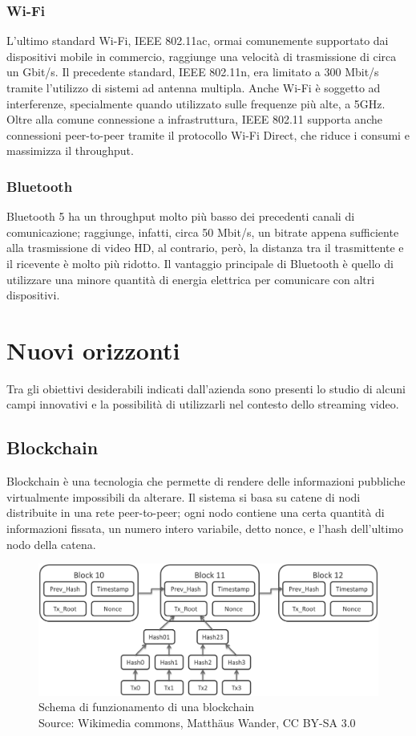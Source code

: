 		\subsubsection{Wi-Fi}
			L'ultimo standard Wi-Fi, \gls{IEEE} 802.11ac, ormai comunemente supportato dai dispositivi mobile in commercio, raggiunge una velocità di trasmissione di circa un Gbit/s. Il precedente standard, \gls{IEEE} 802.11n, era limitato a 300 Mbit/s tramite l'utilizzo di sistemi ad antenna multipla. Anche Wi-Fi è soggetto ad interferenze, specialmente quando utilizzato sulle frequenze più alte, a 5GHz. Oltre alla comune connessione a infrastruttura, \gls{IEEE} 802.11 supporta anche connessioni peer-to-peer tramite il protocollo Wi-Fi Direct, che riduce i consumi e massimizza il throughput.
		\subsubsection{Bluetooth}
			Bluetooth 5 ha un throughput molto più basso dei precedenti canali di comunicazione; raggiunge, infatti, circa 50 Mbit/s, un bitrate appena sufficiente alla trasmissione di video HD, al contrario, però, la distanza tra il trasmittente e il ricevente è molto più ridotto. Il vantaggio principale di Bluetooth è quello di utilizzare una minore quantità di energia elettrica per comunicare con altri dispositivi.

\section{Nuovi orizzonti}
Tra gli obiettivi desiderabili indicati dall'azienda sono presenti lo studio di alcuni campi innovativi e la possibilità di utilizzarli nel contesto dello streaming video.

	\subsection{Blockchain}
	Blockchain è una tecnologia che permette di rendere delle informazioni pubbliche virtualmente impossibili da alterare. Il sistema si basa su catene di nodi distribuite in una rete peer-to-peer; ogni nodo contiene una certa quantità di informazioni fissata, un numero intero variabile, detto nonce, e l'hash dell'ultimo nodo della catena.
	\begin{figure}[H]
		\begin{center}
			\includegraphics[width=16.5cm,keepaspectratio]{immagini/blockchain-data}
			\caption[Schema di funzionamento di una blockchain]{Schema di funzionamento di una blockchain
			\\
			Source: Wikimedia commons, Matthäus Wander, CC BY-SA 3.0}
		\end{center}
	\end{figure}
